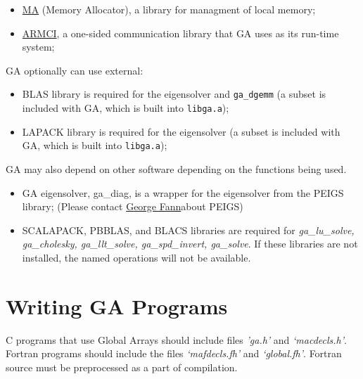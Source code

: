 \begin{itemize}

\item \href{https://hpc.pnl.gov/globalarrays/ma/MAapi.html}{MA} (Memory
Allocator), a library for managment of local memory; 

\item \href{https://hpc.pnl.gov/armci/}{ARMCI}, a one-sided
communication library that GA uses as its run-time system; 

\end{itemize}

GA optionally can use external: 

\begin{itemize}

\item BLAS library is required for the eigensolver and \texttt{ga\_dgemm}
(a subset is included with GA, which is built into \texttt{libga.a});

\item LAPACK library is required for the eigensolver (a subset is included
with GA, which is built into \texttt{libga.a}); 

\end{itemize}

GA may also depend on other software depending on the functions being
used.

\begin{itemize}

\item GA eigensolver, ga\_diag, is a wrapper for the eigensolver from the
PEIGS library; (Please contact \href{mailto:fanngi@ornl.gov}{George Fann}about
PEIGS) 

\item SCALAPACK, PBBLAS, and BLACS libraries are required for \emph{ga\_lu\_solve,
ga\_cholesky, ga\_llt\_solve, ga\_spd\_invert, ga\_solve}. If these
libraries are not installed, the named operations will not be available. 

\end{itemize}

\section{Writing GA Programs}

C programs that use Global Arrays should include files \emph{'ga.h'} and
\emph{`macdecls.h'}. Fortran programs should include the files
\emph{`mafdecls.fh'} and \emph{`global.fh'}. Fortran source must be
preprocessed as a part of compilation.

